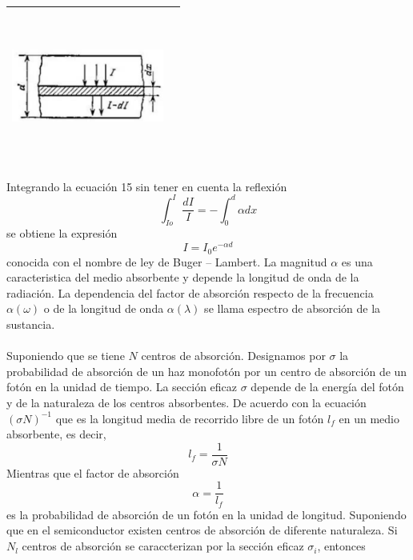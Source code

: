 \documentclass[12]{article}
\newenvironment{Figure}
{\par\medskip\noindent\minipage{\linewidth}}
{\endminipage\par\medskip}
\begin{document}
\begin{multicols}{2}
\begin{Figure}	
\center
\begin{tabular}{|l|r|}
\hline
\includegraphics[width=5cm, height=5cm]{img/absorcionsemiconductor.png} \\ \hline
\end{tabular}
\label{fig:g2}
\end{Figure}
Integrando la ecuación 15 sin tener en cuenta la reflexión 
\begin{equation}
\int_{Io}^{I} \frac{dI}{I} = - \int_{0}^{d} \alpha dx 
\end{equation}
se obtiene la expresión 
\begin{equation}
I = I_{0}e^{- \alpha d}
\end{equation}
conocida con el nombre de ley de Buger – Lambert. La magnitud $\alpha$ es una caracteristica del medio absorbente y depende la longitud de onda de la radiación. La dependencia del factor de absorción respecto de la frecuencia $\alpha(\omega)$ o de la longitud de onda $\alpha(\lambda)$ se llama espectro de absorción de la sustancia.
\\ \\
Suponiendo que se tiene $N$ centros de absorción. Designamos por $\sigma$ la probabilidad de absorción de un haz monofotón por un centro de absorción de un fotón en la unidad de tiempo. La sección eficaz $\sigma$ depende de la energía del fotón y de la naturaleza de los centros absorbentes.
De acuerdo con la ecuación $(\sigma N)^{-1}$ que es la longitud media de recorrido libre de un fotón $l_{f}$ en un medio absorbente, es decir,
\begin{equation}
l_{f} = \frac{1}{\sigma N}
\end{equation}
Mientras que el factor de absorción 
\begin{equation}
\alpha = \frac{1}{l_{f}}
\end{equation}
es la probabilidad de absorción de un fotón en la unidad de longitud. Suponiendo que en el semiconductor existen centros de absorción de diferente naturaleza. Si $N_{l}$ centros de absorción se caraccterizan por la sección eficaz $\sigma_{i}$, entonces

\end{multicols}
\end{document}
